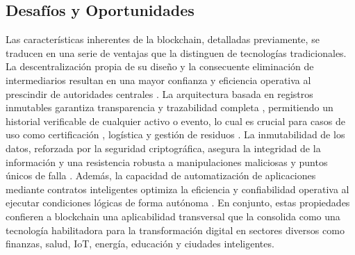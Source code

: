 \subsection{Desafíos y Oportunidades}

Las características inherentes de la blockchain, detalladas previamente, se traducen en una serie de ventajas que la distinguen de tecnologías tradicionales. La descentralización propia de su diseño y la consecuente eliminación de intermediarios resultan en una mayor confianza \cite{rejeb2023role} y eficiencia operativa al prescindir de autoridades centrales \cite{sharabati2024blockchain}. La arquitectura basada en registros inmutables garantiza transparencia y trazabilidad completa \cite{sharabati2024blockchain}, permitiendo un historial verificable de cualquier activo o evento, lo cual es crucial para casos de uso como certificación \cite{bartolomeo2020introduccion}, logística \cite{bartolomeo2020introduccion, rejeb2023role} y gestión de residuos \cite{bulkowska2023implementation}. La inmutabilidad de los datos, reforzada por la seguridad criptográfica, asegura la integridad de la información \cite{sunny2022systematic} y una resistencia robusta a manipulaciones maliciosas y puntos únicos de falla \cite{bartolomeo2020introduccion}. Además, la capacidad de automatización de aplicaciones mediante contratos inteligentes optimiza la eficiencia y confiabilidad operativa al ejecutar condiciones lógicas de forma autónoma \cite{bartolomeo2020introduccion}. En conjunto, estas propiedades confieren a blockchain una aplicabilidad transversal que la consolida como una tecnología habilitadora para la transformación digital en sectores diversos como finanzas, salud, IoT, energía, educación y ciudades inteligentes.

